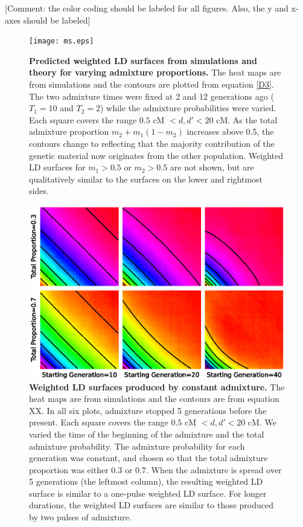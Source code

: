 [Comment: the color coding should be labeled for all figures.  Also, the y and x-axes should be labeled]

\begin{figure}
\texttt{[image: ms.eps]}
\caption{
{\bf Predicted weighted LD surfaces from simulations and theory for varying admixture proportions.} The heat maps are from simulations and the contours are plotted from equation \ref{D3}. The two admixture times were fixed at 2 and 12 generations ago ($T_1=10$ and $T_2=2$) while the admixture probabilities were varied. Each square covers the range $0.5 \text{ cM }<d,d'<20\text{ cM}$. As the total admixture proportion $m_2+m_1(1-m_2)$ increases above 0.5, the contours change to reflecting that the majority contribution of the genetic material now originates from the other population. Weighted LD surfaces for $m_1>0.5$ or $m_2>0.5$ are not shown, but are qualitatively similar to the surfaces on the lower and rightmost sides.  
}
\label{ms}
\end{figure}

\begin{figure}
\includegraphics[scale=.8]{continuous.eps}
\caption{
{\bf Weighted LD surfaces produced by constant admixture.} The heat maps are from simulations and the contours are from equation XX. In all six plots, admixture stopped 5 generations before the present. Each square covers the range $0.5 \text{ cM }<d,d'<20\text{ cM}$. We varied the time of the beginning of the admixture and the total admixture probability. The admixture probability for each generation was constant, and chosen so that the total admixture proportion was either $0.3$ or $0.7$. When the admixture is spread over 5 generations (the leftmost column), the resulting weighted LD surface is similar to a one-pulse weighted LD surface. For longer durations, the weighted LD surfaces are similar to those produced by two pulses of admixture.
}
\label{continuous}
\end{figure}

